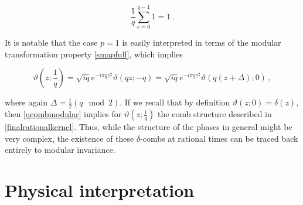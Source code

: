 \documentclass{article}
\newcommand{\T}{\ensuremath{\vartheta}}
\newcommand{\sumZ}{\sum_{n=-\infty}^{\infty}}
\begin{document}
\begin{equation}
    \frac{1}{q}\sum_{c=0}^{q-1} 1 = 1\,.
\end{equation}

It is notable that the case $p = 1$ is easily interpreted in terms of the modular transformation property \eqref{smapfull}, which implies

\begin{equation}\label{qcombmodular}
    \vartheta\left(z;\frac{1}{q}\right) = \sqrt{iq} e^{-i\pi q z^2} \T(qz;-q) = \sqrt{iq} e^{-i\pi q z^2} \T(q(z+\Delta);0)\,,
\end{equation}

where again $\Delta = \frac{1}{2} (q \mod 2)$. If we recall that by definition $\T(z;0) = \delta(z)$, then \eqref{qcombmodular} implies for $\T(z;\frac{1}{q})$ the comb structure described in \eqref{finalrationalkernel}. Thus, while the structure of the phases in general might be very complex, the existence of these $\delta$-combs at rational times can be traced back entirely to modular invariance.

%
%
%
%
%


\section{Physical interpretation}\label{sec:physical}
\end{document}
